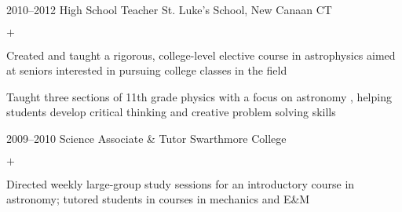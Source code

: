 \documentclass[]{luger-cv} %
\begin{document}
%
%
\begin{entrylist}
    \fi


    \entry
    {2010--2012}
    {High School Teacher}
    {St. Luke's School, New Canaan CT}
    {%
        \vspace{-1em}
        \begin{list}{$+$}{\cvlist}
            \item Created and taught a rigorous, college-level elective course in astrophysics
                  aimed at seniors interested in pursuing college classes in the field
            \item Taught three sections of 11th grade physics with a focus on
                  astronomy
                  \ifdefined \onepage \else
                      , helping students develop critical thinking and creative
                      problem solving skills
                  \fi
        \end{list}
    }


    \ifdefined \onepage \else
        \entry
        {2009--2010}
        {Science Associate \& Tutor}
        {Swarthmore College}
        {%
            \vspace{-1em}
            \begin{list}{$+$}{\cvlist}
                \item Directed weekly large-group study sessions for an introductory course in
                      astronomy; tutored students in courses in mechanics and E\&M
            \end{list}
        }
    \fi


\end{entrylist}



\ifdefined \withother
\end{document}

